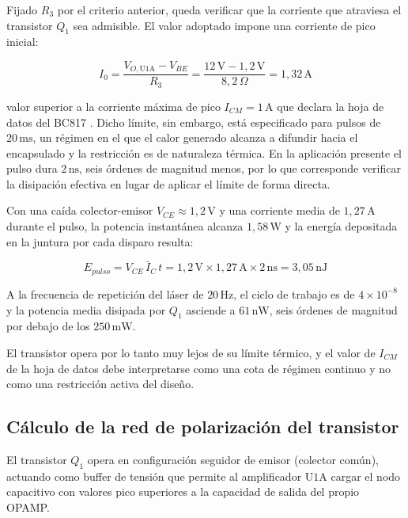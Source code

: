 Fijado $R_3$ por el criterio anterior, queda verificar que la corriente que atraviesa el transistor $Q_1$ sea admisible. El valor adoptado impone una corriente de pico inicial:

\begin{equation}
  I_0 = \frac{V_{O,\text{U1A}} - V_{BE}}{R_3} = \frac{12\,\text{V} - 1{,}2\,\text{V}}{8{,}2\,\Omega} = 1{,}32\,\text{A}
  \label{eq:valor_r3_calc}
\end{equation}

\noindent valor superior a la corriente máxima de pico $I_{CM} = 1\,\text{A}$ que declara la hoja de datos del BC817 \cite{bc817_ds}. Dicho límite, sin embargo, está especificado para pulsos de $20\,\text{ms}$, un régimen en el que el calor generado alcanza a difundir hacia el encapsulado y la restricción es de naturaleza térmica. En la aplicación presente el pulso dura $2\,\text{ns}$, seis órdenes de magnitud menos, por lo que corresponde verificar la disipación efectiva en lugar de aplicar el límite de forma directa.

Con una caída colector-emisor $V_{CE} \approx 1{,}2\,\text{V}$ y una corriente media de $1{,}27\,\text{A}$ durante el pulso, la potencia instantánea alcanza $1{,}58\,\text{W}$ y la energía depositada en la juntura por cada disparo resulta:

\begin{equation}
  E_{pulso} = V_{CE}\, \bar{I}_C\, t = 1{,}2\,\text{V} \times 1{,}27\,\text{A} \times 2\,\text{ns} = 3{,}05\,\text{nJ}
  \label{eq:energia_pulso_q1}
\end{equation}

A la frecuencia de repetición del láser de $20\,\text{Hz}$, el ciclo de trabajo es de $4\times10^{-8}$ y la potencia media disipada por $Q_1$ asciende a $61\,\text{nW}$, seis órdenes de magnitud por debajo de los $250\,\text{mW}$.

 El transistor opera por lo tanto muy lejos de su límite térmico, y el valor de $I_{CM}$ de la hoja de datos debe interpretarse como una cota de régimen continuo y no como una restricción activa del diseño.


\subsection{Cálculo de la red de polarización del transistor}

El transistor $Q_1$ opera en configuración seguidor de emisor (colector común), actuando como buffer de tensión que permite al amplificador $\text{U1A}$ cargar el nodo capacitivo con valores pico superiores a la capacidad de salida del propio OPAMP.

